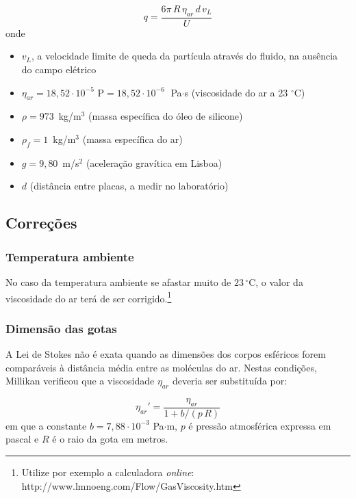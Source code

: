 \documentclass[a4paper,twoside,12pt]{article}      %
\begin{document}
\begin{equation}
	\label{eq:carga}
	q = \frac{6 \pi \, R \, \eta_{ar} \, d\, v_L}{U}  
\end{equation}
onde

\begin{itemize}
\item $v_L$, a velocidade limite de queda da partícula através do fluido, na ausência do campo elétrico
\item $\eta_{ar} = 18,52 \cdot 10^{-5}$ P$ =  18,52 \cdot 10^{-6} \;$ Pa$\cdot$s (viscosidade do ar a 23 $^{\circ}$C)
\item $\rho = 973 \,$ kg/m$^{3}$ (massa específica do óleo de silicone)
\item $\rho_f = 1 \,$ kg/m$^{3}$ (massa específica do ar)
\item $g=9,80\,$ m/s$^{2}$ (aceleração gravítica em Lisboa)
\item $d$ (distância entre placas, a medir no laboratório)
\end{itemize}

\subsection{\sf Correções}
\subsubsection{\sf Temperatura ambiente}

No caso da temperatura ambiente se afastar muito de $23\,^{\circ}\mathrm{C}$, o valor  da viscosidade do ar terá de ser corrigido.\footnote{Utilize por exemplo a calculadora \emph{online}: http://www.lmnoeng.com/Flow/GasViscosity.htm}

\subsubsection{\sf Dimensão das gotas}

A Lei de Stokes não é exata quando as dimensões dos corpos esféricos forem comparáveis à distância média entre as moléculas do ar. Nestas condições, Millikan verificou que a viscosidade $\eta_{ar}$ deveria ser substituída por:

\begin{equation}
	\label{eq:correcao}
	\eta_{ar}' = \frac{\eta_{ar}}{1 + b/(p\,R)}  
\end{equation}
em que a constante $b=7,88\cdot 10^{-3}$ Pa$\cdot$m, 
$p$ é pressão atmosférica expressa em pascal e $R$ é o raio da gota em metros.
\end{document}
